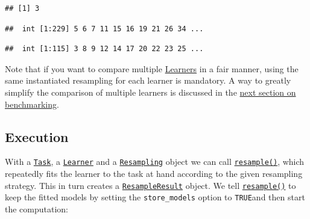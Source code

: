 \documentclass[
]{scrbook}
\newenvironment{Shaded}{\begin{snugshade}}{\end{snugshade}}
\newcommand{\AttributeTok}[1]{\textcolor[rgb]{0.77,0.63,0.00}{#1}}
\newcommand{\DecValTok}[1]{\textcolor[rgb]{0.00,0.00,0.81}{#1}}
\newcommand{\FunctionTok}[1]{\textcolor[rgb]{0.00,0.00,0.00}{#1}}
\newcommand{\NormalTok}[1]{#1}
\newcommand{\OtherTok}[1]{\textcolor[rgb]{0.56,0.35,0.01}{#1}}
\newcommand{\SpecialCharTok}[1]{\textcolor[rgb]{0.00,0.00,0.00}{#1}}
\newcommand{\StringTok}[1]{\textcolor[rgb]{0.31,0.60,0.02}{#1}}
\renewenvironment{Shaded} {\begin{snugshade}\small} {\end{snugshade}}
\begin{document}
\begin{Shaded}
\end{Shaded}

\begin{verbatim}
## [1] 3
\end{verbatim}

\begin{Shaded}
\end{Shaded}

\begin{verbatim}
##  int [1:229] 5 6 7 11 15 16 19 21 26 34 ...
\end{verbatim}

\begin{Shaded}
\end{Shaded}

\begin{verbatim}
##  int [1:115] 3 8 9 12 14 17 20 22 23 25 ...
\end{verbatim}

Note that if you want to compare multiple \protect\hyperlink{learners}{Learners} in a fair manner, using the same instantiated resampling for each learner is mandatory.
A way to greatly simplify the comparison of multiple learners is discussed in the \protect\hyperlink{benchmarking}{next section on benchmarking}.

\hypertarget{resampling-exec}{%
\subsection{Execution}\label{resampling-exec}}

With a \href{https://mlr3.mlr-org.com/reference/Task.html}{\texttt{Task}}, a \href{https://mlr3.mlr-org.com/reference/Learner.html}{\texttt{Learner}} and a \href{https://mlr3.mlr-org.com/reference/Resampling.html}{\texttt{Resampling}} object we can call \href{https://mlr3.mlr-org.com/reference/resample.html}{\texttt{resample()}}, which repeatedly fits the learner to the task at hand according to the given resampling strategy.
This in turn creates a \href{https://mlr3.mlr-org.com/reference/ResampleResult.html}{\texttt{ResampleResult}} object.
We tell \href{https://mlr3.mlr-org.com/reference/resample.html}{\texttt{resample()}} to keep the fitted models by setting the \texttt{store\_models} option to \texttt{TRUE}and then start the computation:
\end{document}
